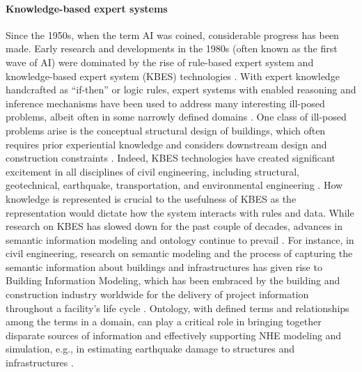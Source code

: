 \paragraph{Knowledge-based expert systems} Since the 1950s, when the term AI was coined, considerable progress has been made. Early research and developments in the 1980s (often known as the first wave of AI) were dominated by the rise of rule-based expert system and knowledge-based expert system (KBES) technologies \citep{hayes-roth1983building}. With expert knowledge handcrafted as ``if-then'' or logic rules, expert systems with enabled reasoning and inference mechanisms have been used to address many interesting ill-posed problems, albeit often in some narrowly defined domains \citep{simon1973structure}. One class of ill-posed problems arise is the conceptual structural design of buildings, which often requires prior experiential knowledge and considers downstream design and construction constraints \citep{sriram1985knowledgebased,kumar1997cadrem, jain1991formal-i, jain1991formal-ii}. Indeed, KBES technologies have created significant excitement in all disciplines of civil engineering, including structural, geotechnical, earthquake, transportation, and environmental engineering \citep{kostem1986expert,palmer1987special,dym1991knowledgebased,cohn1992knowledgebased,sriram1997intelligent}. How knowledge is represented is crucial to the usefulness of KBES as the representation would dictate how the system interacts with rules and data. While research on KBES has slowed down for the past couple of decades, advances in semantic information modeling and ontology continue to prevail \citep{stevens2000ontologybased,noy2009bioportal}. For instance, in civil engineering, research on semantic modeling and the process of capturing the semantic information about buildings and infrastructures has given rise to Building Information Modeling, which has been embraced by the building and construction industry worldwide for the delivery of project information throughout a facility's life cycle \citep{sacks2018bim}. Ontology, with defined terms and relationships among the terms in a domain, can play a critical role in bringing together disparate sources of information and effectively supporting NHE modeling and simulation, e.g., in estimating earthquake damage to structures and infrastructures \citep{yu2016image}.

 
